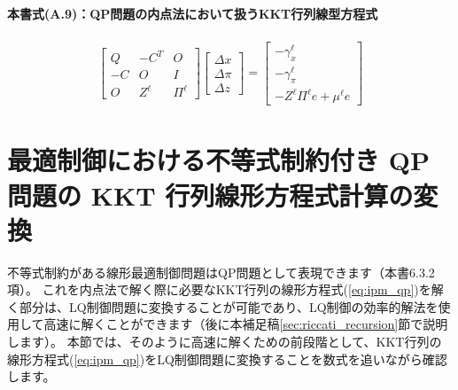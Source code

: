 \documentclass[a4paper]{jarticle}
\begin{document}
\paragraph{本書\cite{fukatsu2024python}式(A.9)：QP問題の内点法において扱うKKT行列線型方程式}

\begin{align}
\begin{bmatrix}
Q & - C^T & O 
\\
- C & O & I 
\\
O & Z^\ell & \Pi^\ell
\end{bmatrix}
\begin{bmatrix}
\Delta x
\\
\Delta \pi
\\
\Delta z
\end{bmatrix}
=
\begin{bmatrix}
-\gamma_x^\ell
\\
-\gamma_\pi^\ell
\\
-Z^\ell\Pi^\ell e +\mu^\ell e
\end{bmatrix}
\label{eq:ipm_qp}
\end{align}


\clearpage
\section{最適制御における不等式制約付き QP 問題の KKT 行列線形方程式計算の変換}
\label{sec:handling_inequality}

不等式制約がある線形最適制御問題はQP問題として表現できます（本書\cite{fukatsu2024python}6.3.2項）。
これを内点法で解く際に必要なKKT行列の線形方程式(\ref{eq:ipm_qp})を解く部分は、LQ制御問題に変換することが可能\cite{rao1998application}であり、LQ制御の効率的解法を使用して高速に解くことができます（後に本補足稿\ref{sec:riccati_recursion}節で説明します）。
本節では、そのように高速に解くための前段階として、KKT行列の線形方程式(\ref{eq:ipm_qp})をLQ制御問題に変換することを数式を追いながら確認します。
\end{document}
